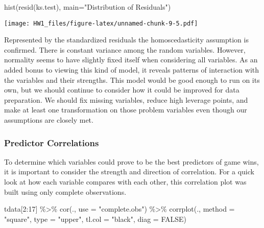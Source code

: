 \documentclass[
]{article}
\newenvironment{Shaded}{\begin{snugshade}}{\end{snugshade}}
\newcommand{\AttributeTok}[1]{\textcolor[rgb]{0.77,0.63,0.00}{#1}}
\newcommand{\ConstantTok}[1]{\textcolor[rgb]{0.00,0.00,0.00}{#1}}
\newcommand{\DecValTok}[1]{\textcolor[rgb]{0.00,0.00,0.81}{#1}}
\newcommand{\FunctionTok}[1]{\textcolor[rgb]{0.00,0.00,0.00}{#1}}
\newcommand{\NormalTok}[1]{#1}
\newcommand{\SpecialCharTok}[1]{\textcolor[rgb]{0.00,0.00,0.00}{#1}}
\newcommand{\StringTok}[1]{\textcolor[rgb]{0.31,0.60,0.02}{#1}}
\begin{document}
\begin{Shaded}
\begin{Highlighting}[]
\FunctionTok{hist}\NormalTok{(}\FunctionTok{resid}\NormalTok{(ks.test), }\AttributeTok{main=}\StringTok{"Distribution of Residuals"}\NormalTok{)}
\end{Highlighting}
\end{Shaded}

\texttt{[image: HW1\_files/figure-latex/unnamed-chunk-9-5.pdf]}

Represented by the standardized residuals the homoscedasticity
assumption is confirmed. There is constant variance among the random
variables. However, normality seems to have slightly fixed itself when
considering all variables. As an added bonus to viewing this kind of
model, it reveals patterns of interaction with the variables and their
strengths. This model would be good enough to run on its own, but we
should continue to consider how it could be improved for data
preparation. We should fix missing variables, reduce high leverage
points, and make at least one transformation on those problem variables
even though our assumptions are closely met.

\hypertarget{predictor-correlations}{%
\subsubsection{Predictor Correlations}\label{predictor-correlations}}

To determine which variables could prove to be the best predictors of
game wins, it is important to consider the strength and direction of
correlation. For a quick look at how each variable compares with each
other, this correlation plot was built using only complete observations.

\begin{Shaded}
\begin{Highlighting}[]
\NormalTok{tdata[}\DecValTok{2}\SpecialCharTok{:}\DecValTok{17}\NormalTok{] }\SpecialCharTok{\%\textgreater{}\%}
  \FunctionTok{cor}\NormalTok{(., }\AttributeTok{use =} \StringTok{"complete.obs"}\NormalTok{) }\SpecialCharTok{\%\textgreater{}\%}
  \FunctionTok{corrplot}\NormalTok{(., }\AttributeTok{method =} \StringTok{"square"}\NormalTok{, }\AttributeTok{type =} \StringTok{"upper"}\NormalTok{, }\AttributeTok{tl.col =} \StringTok{"black"}\NormalTok{, }\AttributeTok{diag =} \ConstantTok{FALSE}\NormalTok{)}
\end{Highlighting}
\end{Shaded}
\end{document}
